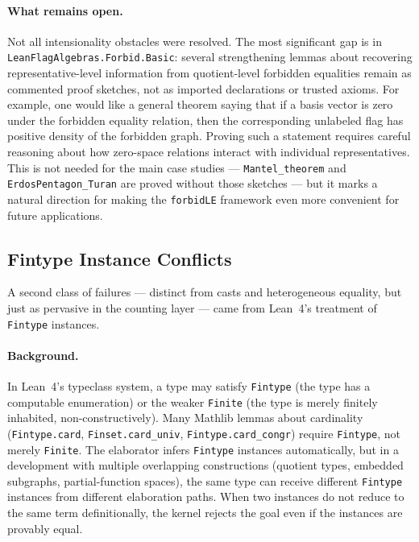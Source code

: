 \documentclass{article}
\newcommand{\lean}[1]{\texttt{#1}}
\begin{document}
\paragraph{What remains open.}
Not all intensionality obstacles were resolved.  The most significant gap is in
\lean{LeanFlagAlgebras.Forbid.Basic}: several strengthening lemmas about
recovering representative-level information from quotient-level forbidden
equalities remain as commented proof sketches, not as imported declarations or
trusted axioms.  For example, one would like a general theorem saying that if a
basis vector is zero under the forbidden equality relation, then the
corresponding unlabeled flag has positive density of the forbidden graph.
Proving such a
statement requires careful reasoning about how zero-space relations interact
with individual representatives.  This is not needed for the main case studies
--- \lean{Mantel\_theorem} and \lean{ErdosPentagon\_Turan} are proved without
those sketches --- but it marks a natural direction for making the
\lean{forbidLE} framework even more convenient for future applications.

\subsection{Fintype Instance Conflicts}
\label{sec:fintype}

A second class of failures --- distinct from casts and heterogeneous equality,
but just as pervasive in the counting layer --- came from Lean~4's treatment of
\lean{Fintype} instances.

\paragraph{Background.}
In Lean~4's typeclass system, a type may satisfy \lean{Fintype} (the type has a
computable enumeration) or the weaker \lean{Finite} (the type is merely
finitely inhabited, non-constructively).  Many Mathlib lemmas about cardinality
(\lean{Fintype.card}, \lean{Finset.card\_univ}, \lean{Fintype.card\_congr})
require \lean{Fintype}, not merely \lean{Finite}.  The elaborator infers
\lean{Fintype} instances automatically, but in a development with multiple
overlapping constructions (quotient types, embedded subgraphs, partial-function
spaces), the same type can receive different \lean{Fintype} instances from
different elaboration paths.  When two instances do not reduce to the same term
definitionally, the kernel rejects the goal even if the instances are provably
equal.
\end{document}
